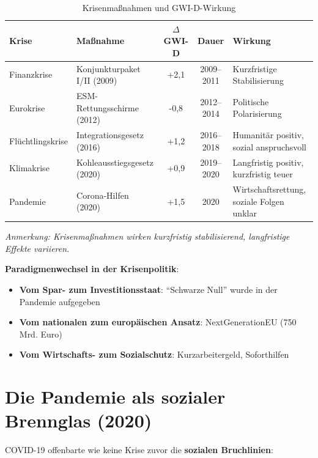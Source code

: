 \begin{table}[ht]
    \centering
    \caption{Krisenmaßnahmen und GWI-D-Wirkung}
    \label{tab:massnahmen_krisen}
    \begin{tabular}{llccp{5.5cm}}
        \toprule
        \textbf{Krise} & \textbf{Maßnahme} & \textbf{$\Delta$ GWI-D} & \textbf{Dauer} & \textbf{Wirkung} \\
        \midrule
        Finanzkrise & Konjunkturpaket I/II (2009) & +2,1 & 2009–2011 & Kurzfristige Stabilisierung \\
        Eurokrise & ESM-Rettungsschirme (2012) & -0,8 & 2012–2014 & Politische Polarisierung \\
        Flüchtlingskrise & Integrationsgesetz (2016) & +1,2 & 2016–2018 & Humanitär positiv, sozial anspruchsvoll \\
        Klimakrise & Kohleausstiegsgesetz (2020) & +0,9 & 2019–2020 & Langfristig positiv, kurzfristig teuer \\
        Pandemie & Corona-Hilfen (2020) & +1,5 & 2020 & Wirtschaftsrettung, soziale Folgen unklar \\
        \bottomrule
    \end{tabular}
\end{table}

\begin{flushleft}
\footnotesize{\textit{Anmerkung: Krisenmaßnahmen wirken kurzfristig stabilisierend, langfristige Effekte variieren.}}
\end{flushleft}

\textbf{Paradigmenwechsel in der Krisenpolitik}:

\begin{itemize}
    \item \textbf{Vom Spar- zum Investitionsstaat}: \enquote{Schwarze Null} wurde in der Pandemie aufgegeben
    \item \textbf{Vom nationalen zum europäischen Ansatz}: NextGenerationEU (750 Mrd. Euro)
    \item \textbf{Vom Wirtschafts- zum Sozialschutz}: Kurzarbeitergeld, Soforthilfen
\end{itemize}

\section{Die Pandemie als sozialer Brennglas (2020)}

COVID-19 offenbarte wie keine Krise zuvor die \textbf{sozialen Bruchlinien}:

